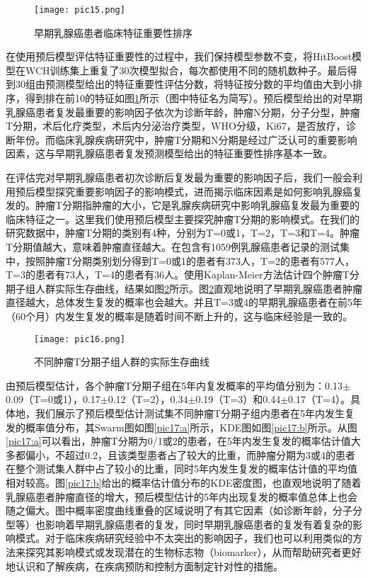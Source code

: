 \begin{figure}[H]
\texttt{[image: pic15.png]}
\caption{早期乳腺癌患者临床特征重要性排序}
\label{pic15}
\end{figure}

在使用预后模型评估特征重要性的过程中，我们保持模型参数不变，将HitBoost模型在WCH训练集上重复了30次模型拟合，每次都使用不同的随机数种子。最后得到30组由预测模型给出的特征重要性评估分数，将特征按分数的平均值由大到小排序，得到排在前10的特征如图\ref{pic15}所示（图中特征名为简写）。预后模型给出的对早期乳腺癌患者复发最重要的影响因子依次为诊断年龄，肿瘤N分期，分子分型，肿瘤T分期，术后化疗类型，术后内分泌治疗类型，WHO分级，Ki67，是否放疗，诊断年份。而临床乳腺疾病研究中，肿瘤T分期和N分期是经过广泛认可的重要影响因素，这与早期乳腺癌患者复发预测模型给出的特征重要性排序基本一致。

在评估完对早期乳腺癌患者初次诊断后复发最为重要的影响因子后，我们一般会利用预后模型探究重要影响因子的影响模式，进而揭示临床因素是如何影响乳腺癌复发的。肿瘤T分期指肿瘤的大小，它是乳腺疾病研究中影响乳腺癌复发最为重要的临床特征之一。这里我们使用预后模型主要探究肿瘤T分期的影响模式。在我们的研究数据中，肿瘤T分期的类别有4种，分别为T=0或1，T=2，T=3和T=4。肿瘤T分期值越大，意味着肿瘤直径越大。在包含有1059例乳腺癌患者记录的测试集中，按照肿瘤T分期类别划分得到T=0或1的患者有373人，T=2的患者有577人，T=3的患者有73人，T=4的患者有36人。使用Kaplan-Meier方法估计四个肿瘤T分期子组人群实际生存曲线，结果如图\ref{pic16}所示。图\ref{pic16}直观地说明了早期乳腺癌患者肿瘤直径越大，总体发生复发的概率也会越大。并且T=3或4的早期乳腺癌患者在前5年（60个月）内发生复发的概率是随着时间不断上升的，这与临床经验是一致的。

\begin{figure}[H]
\texttt{[image: pic16.png]}
\caption{不同肿瘤T分期子组人群的实际生存曲线}
\label{pic16}
\end{figure}

由预后模型估计，各个肿瘤T分期子组在5年内复发概率的平均值分别为：0.13$\pm$0.09（T=0或1），0.17$\pm$0.12（T=2），0.34$\pm$0.19（T=3）和0.44$\pm$0.17（T=4）。具体地，我们展示了预后模型估计测试集不同肿瘤T分期子组内患者在5年内发生复发的概率值分布，其Swarm图如图\ref{pic17:a}所示，KDE图如图\ref{pic17:b}所示。从图\ref{pic17:a}可以看出，肿瘤T分期为0/1或2的患者，在5年内发生复发的概率估计值大多都偏小，不超过0.2，且该类型患者占了较大的比重，而肿瘤分期为3或4的患者在整个测试集人群中占了较小的比重，同时5年内发生复发的概率估计值的平均值相对较高。图\ref{pic17:b}给出的概率估计值分布的KDE密度图，也直观地说明了随着乳腺癌患者肿瘤直径的增大，预后模型估计的5年内出现复发的概率值总体上也会随之偏大。图中概率密度曲线重叠的区域说明了有其它因素（如诊断年龄，分子分型等）也影响着早期乳腺癌患者的复发，同时早期乳腺癌患者的复发有着复杂的影响模式。对于临床疾病研究经验中不太突出的影响因子，我们也可以利用类似的方法来探究其影响模式或发现潜在的生物标志物（biomarker），从而帮助研究者更好地认识和了解疾病，在疾病预防和控制方面制定针对性的措施。

